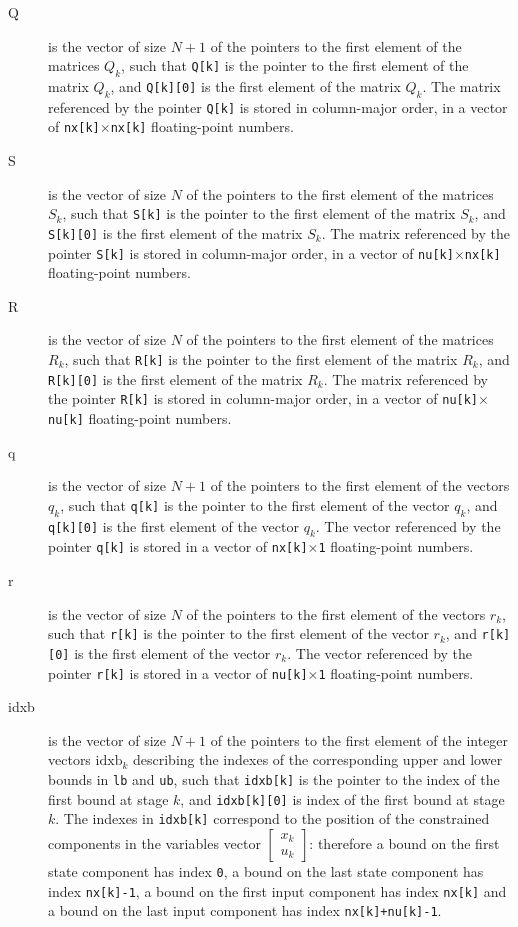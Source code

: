 \documentclass{report}
\begin{document}
\begin{description}
\begin{description}
		\item[Q] is the vector of size $N+1$ of the pointers to the first element of the matrices $Q_k$, such that \texttt{Q[k]} is the pointer to the first element of the matrix $Q_k$, and \texttt{Q[k][0]} is the first element of the matrix $Q_k$.
		The matrix referenced by the pointer \texttt{Q[k]} is stored in column-major order, in a vector of \texttt{nx[k]$\times$nx[k]} floating-point numbers.
		\item[S] is the vector of size $N$ of the pointers to the first element of the matrices $S_k$, such that \texttt{S[k]} is the pointer to the first element of the matrix $S_k$, and \texttt{S[k][0]} is the first element of the matrix $S_k$.
		The matrix referenced by the pointer \texttt{S[k]} is stored in column-major order, in a vector of \texttt{nu[k]$\times$nx[k]} floating-point numbers.
		\item[R] is the vector of size $N$ of the pointers to the first element of the matrices $R_k$, such that \texttt{R[k]} is the pointer to the first element of the matrix $R_k$, and \texttt{R[k][0]} is the first element of the matrix $R_k$.
		The matrix referenced by the pointer \texttt{R[k]} is stored in column-major order, in a vector of \texttt{nu[k]$\times$nu[k]} floating-point numbers.
		\item[q] is the vector of size $N+1$ of the pointers to the first element of the vectors $q_k$, such that \texttt{q[k]} is the pointer to the first element of the vector $q_k$, and \texttt{q[k][0]} is the first element of the vector $q_k$.
		The vector referenced by the pointer \texttt{q[k]} is stored in a vector of \texttt{nx[k]$\times$1} floating-point numbers.
		\item[r] is the vector of size $N$ of the pointers to the first element of the vectors $r_k$, such that \texttt{r[k]} is the pointer to the first element of the vector $r_k$, and \texttt{r[k][0]} is the first element of the vector $r_k$.
		The vector referenced by the pointer \texttt{r[k]} is stored in a vector of \texttt{nu[k]$\times$1} floating-point numbers.
		\item[idxb] is the vector of size $N+1$ of the pointers to the first element of the integer vectors $\mathrm{idxb}_k$ describing the indexes of the corresponding upper and lower bounds in \texttt{lb} and \texttt{ub}, such that \texttt{idxb[k]} is the pointer to the index of the first bound at stage $k$, and \texttt{idxb[k][0]} is index of the first bound at stage $k$.
		The indexes in \texttt{idxb[k]} correspond to the position of the constrained components in the variables vector $\begin{bmatrix} x_k \\ u_k \end{bmatrix}$: therefore a bound on the first state component has index \texttt{0}, a bound on the last state component has index \texttt{nx[k]-1}, a bound on the first input component has index \texttt{nx[k]} and a bound on the last input component has index \texttt{nx[k]+nu[k]-1}.

\end{description}
\end{description}
\end{document}
